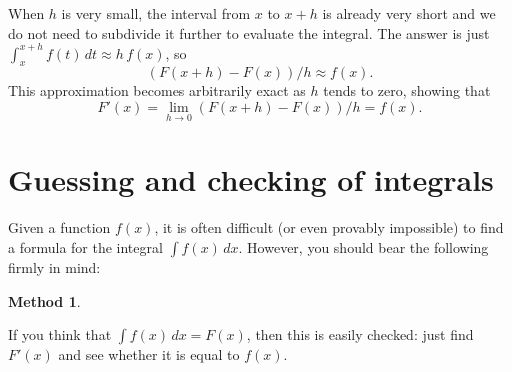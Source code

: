 \documentclass[a4paper]{book}
\newcommand{\xra}       {\xrightarrow}
\renewcommand{\:}{\colon}
\newcommand{\bilabel}[1]{\hypertarget{#1}{\label{#1}}}
\theoremstyle{definition}
\newtheorem{method}[theorem]{Method}
\begin{document}
\begin{itemize}
\begin{center}
  \end{center}
  When $h$ is very small, the interval from $x$ to $x+h$ is already very
  short and we do not need to subdivide it further to evaluate the
  integral.  The answer is just $\int_x^{x+h}f(t)\,dt\approx h\,f(x)$,
  so
  \[ (F(x+h) - F(x))/h \approx f(x). \]
  This approximation becomes arbitrarily exact as $h$ tends to zero,
  showing that 
  \[ F'(x) = \lim_{h\xra{}0} (F(x+h) - F(x))/h = f(x). \]
\end{itemize}

\section{Guessing and checking of integrals}
\label{sec-int-guess}

Given a function $f(x)$, it is often difficult (or even provably
impossible) to find a formula for the integral $\int f(x)\,dx$.
However, you should bear the following firmly in mind:
\begin{method}\bilabel{alg-int-check}
 If you think that $\int f(x)\,dx=F(x)$, then this is easily checked:
 just find $F'(x)$ and see whether it is equal to $f(x)$.
\end{method}
\end{document}

